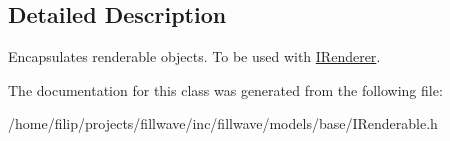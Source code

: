 \subsection{Detailed Description}
Encapsulates renderable objects. To be used with \hyperlink{classflw_1_1flf_1_1IRenderer}{I\+Renderer}. 

The documentation for this class was generated from the following file\+:\begin{DoxyCompactItemize}
\item 
/home/filip/projects/fillwave/inc/fillwave/models/base/I\+Renderable.\+h\end{DoxyCompactItemize}
